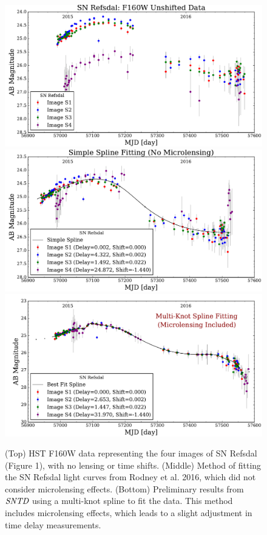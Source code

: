 \begin{figure}[h]

\centering
\includegraphics[width=.78\textwidth]{points_plot_2017.pdf}
\includegraphics[width=.78\textwidth]{refs_plot_2017.pdf}
\includegraphics[width=.78\textwidth]{spline_plot_2017.pdf}
\caption{(Top) HST F160W data representing the four images of SN
Refsdal (Figure 1), with no lensing or time shifts. (Middle) Method of
fitting the SN Refsdal light curves from Rodney et al. 2016, which did
not consider microlensing effects. (Bottom) Preliminary results from 
$\textit{SNTD}$ using a multi-knot spline to fit the data. This method 
includes microlensing effects, which leads to a slight adjustment in 
time delay measurements. }
\end{figure}

\pagebreak


